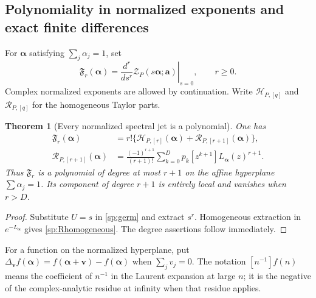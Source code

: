 \documentclass[11pt,letterpaper]{article}
\numberwithin{equation}{section}
\theoremstyle{plain}
\newtheorem{theorem}{Theorem}[section]
\theoremstyle{definition}
\theoremstyle{remark}
\newcommand{\cZ}{\mathcal Z}
\newcommand{\cH}{\mathcal H}
\newcommand{\cR}{\mathcal R}
\begin{document}
\subsection{Polynomiality in normalized exponents and exact finite differences}

For $\boldsymbol\alpha$ satisfying $\sum_j\alpha_j=1$, set
\begin{equation}\label{sp:F}
 \mathfrak F_r(\boldsymbol\alpha)
   =\left.\frac{d^r}{ds^r}
          \cZ_P(s\boldsymbol\alpha;\boldsymbol a)\right|_{s=0},
 \qquad r\ge0.
\end{equation}
Complex normalized exponents are allowed by continuation. Write
$\cH_{P,[q]}$ and $\cR_{P,[q]}$ for the homogeneous Taylor parts.

\begin{theorem}[Every normalized spectral jet is a polynomial]
\label{sp:thm:polynomial}
One has
\begin{align}
 \mathfrak F_r(\boldsymbol\alpha)
  &=r!\{\cH_{P,[r]}(\boldsymbol\alpha)
                +\cR_{P,[r+1]}(\boldsymbol\alpha)\},\label{sp:homogeneous}\\
 \cR_{P,[r+1]}(\boldsymbol\alpha)
  &=\frac{(-1)^{r+1}}{(r+1)!}
      \sum_{k=0}^D p_k[z^{k+1}]L_{\boldsymbol\alpha}(z)^{r+1}.
 \label{sp:Rhomogeneous}
\end{align}
Thus $\mathfrak F_r$ is a polynomial of degree at most $r+1$ on the
affine hyperplane $\sum\alpha_j=1$. Its component of degree $r+1$
is entirely local and vanishes when $r>D$.
\end{theorem}
\begin{proof}
Substitute $U=s$ in \eqref{sp:germ} and extract $s^r$.
Homogeneous extraction in $e^{-L_{\boldsymbol\alpha}}$ gives
\eqref{sp:Rhomogeneous}. The degree assertions follow immediately.
\end{proof}

For a function on the normalized hyperplane, put
$\Delta_{\boldsymbol v}f(\boldsymbol\alpha)
=f(\boldsymbol\alpha+\boldsymbol v)-f(\boldsymbol\alpha)$ when
$\sum_jv_j=0$. The notation $[n^{-1}]f(n)$ means the coefficient
of $n^{-1}$ in the Laurent expansion at large $n$; it is the negative
of the complex-analytic residue at infinity when that residue applies.
\end{document}
